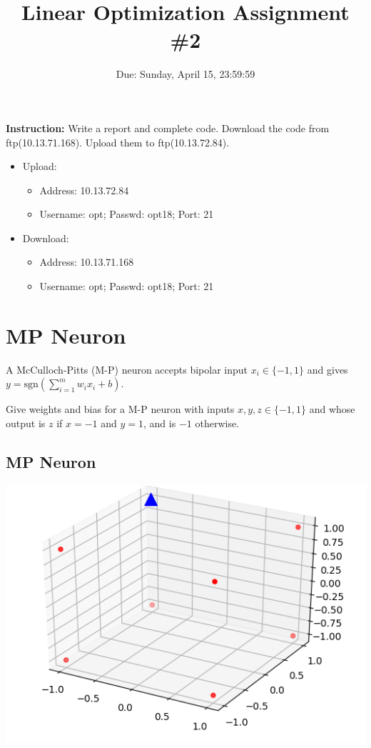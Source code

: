 \documentclass[12pt]{article}
\title{\textbf{Linear Optimization Assignment \#2}}
\author{Due: Sunday, April 15, 23:59:59}
\date{}
\providecommand{\tightlist}{%
	\setlength{\itemsep}{0pt}\setlength{\parskip}{0pt}}
\begin{document}
\maketitle

\textbf{\color{NavyBlue}Instruction:} Write a report and complete code.
Download the code from ftp(10.13.71.168). Upload them to ftp(10.13.72.84).
\begin{itemize}
	\tightlist
	\item Upload:
	      \begin{itemize}
		      \tightlist
		      \item    Address: 10.13.72.84
		      \item Username: opt; Passwd:  opt18; Port: 21
	      \end{itemize}
	\item Download:
	      \begin{itemize}
		      \tightlist
		      \item Address: 10.13.71.168
		      \item  Username: opt; Passwd:  opt18; Port: 21
	      \end{itemize}
\end{itemize}



\section{MP Neuron}

A McCulloch-Pitts (M-P) neuron accepts bipolar input $x_i \in \{-1,1\}$ and gives  $y=\mathrm{sgn} (\sum_{i=1}^{m} w_ix_i + b) $.

Give weights and bias for a M-P neuron with inputs
$x,y,z \in \{-1,1\}$ and whose output is  $z$ if $x = -1$ and $y = 1$, and is $-1$ otherwise.

\subsection{MP Neuron}

{
	\centering
	\includegraphics[width=.5\textwidth]{fig/2018-04-02-14-19-18.png}
}
\end{document}

